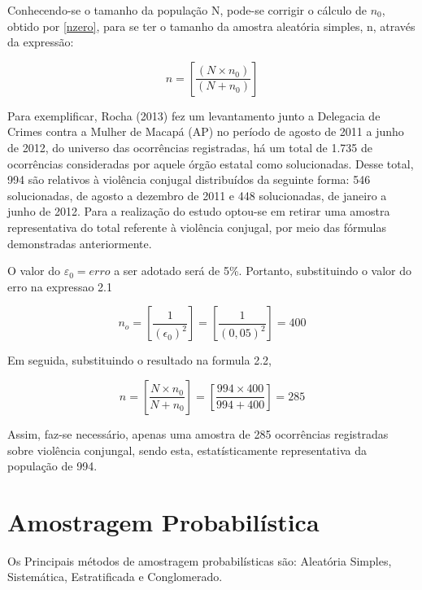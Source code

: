 \newpage
Conhecendo-se o tamanho da população N, pode-se corrigir o cálculo de $n_{0}$, obtido por \ref{nzero}, para se ter o tamanho da amostra aleatória simples, n, através da expressão:


\begin{equation}\label{nzero2}
    n= \left[ \frac{\left(N \times n_{0}\right)}{\left(N + n_{0}\right)} \right]
\end{equation}


Para exemplificar, Rocha (2013) fez um levantamento junto a
Delegacia de Crimes contra a Mulher de Macapá (AP) no  período de
agosto de 2011 a junho de 2012, do universo das ocorrências
registradas, há um total de 1.735 de ocorrências consideradas por
aquele órgão estatal como solucionadas. Desse total, 994 são
relativos à violência conjugal distribuídos da seguinte forma: 546
solucionadas, de agosto a dezembro de 2011 e 448 solucionadas, de
janeiro a junho de 2012. Para a realização do estudo optou-se em
retirar uma amostra representativa do total referente à violência
conjugal, por meio das fórmulas demonstradas anteriormente.

\vskip0.3cm


O valor do $\varepsilon_{0}=erro$ a ser adotado será de 5\%.
Portanto, substituindo o valor do erro na expressao 2.1

\begin{equation}\label{nzero}
    n_{o}= \left[ \frac{1}{\left(\epsilon_{0}\right)^2} \right] = \left[ \frac{1}{\left(0,05
    \right)^2} \right]= 400
\end{equation}

Em seguida, substituindo o resultado na formula 2.2,

\begin{equation}\label{nzero2}
    n=\left[\frac{N \times n_{0}}{N + n_{0}}\right]=
    \left[\frac{994 \times 400}{994 + 400}\right]=285
\end{equation}

Assim, faz-se necessário, apenas uma amostra de 285 ocorrências
registradas sobre violência conjungal, sendo esta,
estatísticamente representativa da população de 994.



\newpage
\section{Amostragem Probabilística}
\inic  Os Principais métodos de amostragem probabilísticas são: Aleatória Simples, Sistemática, Estratificada e Conglomerado.

